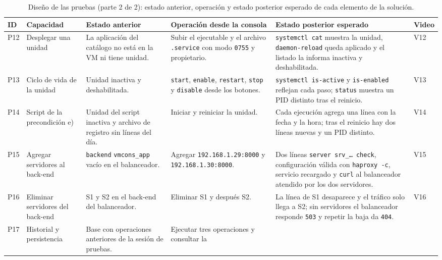 \begin{table}[!tp]
  \centering
  \caption{Diseño de las pruebas (parte 2 de 2): estado anterior,
  operación y estado posterior esperado de cada elemento de la solución.}
  \label{tab:diseno-pruebas-b}
  \scriptsize
  \begin{tabularx}{\textwidth}{@{}l >{\raggedright\arraybackslash}p{2.3cm}
      >{\raggedright\arraybackslash}X >{\raggedright\arraybackslash}X
      >{\raggedright\arraybackslash}X
      >{\raggedright\arraybackslash}p{1.0cm}@{}}
    \hline
    ID & Capacidad & Estado anterior & Operación desde la consola &
    Estado posterior esperado & Video \\
    \hline
    P12 & Desplegar una unidad & La aplicación del catálogo no está en
    la VM ni tiene unidad. & Subir el ejecutable y el archivo
    \texttt{.service} con modo \texttt{0755} y propietario. &
    \texttt{systemctl cat} muestra la unidad, \texttt{daemon-reload}
    queda aplicado y el listado la informa inactiva y deshabilitada.
    & V12 \\
    P13 & Ciclo de vida de la unidad & Unidad inactiva y deshabilitada.
    & \texttt{start}, \texttt{enable}, \texttt{restart},
    \texttt{stop} y \texttt{disable} desde los botones. &
    \texttt{systemctl is-active} y \texttt{is-enabled} reflejan cada
    paso; \texttt{status} muestra un PID distinto tras el reinicio.
    & V13 \\
    P14 & Script de la precondición e) & Unidad del script inactiva y
    archivo de registro sin líneas del día. & Iniciar y reiniciar la
    unidad. & Cada ejecución agrega una línea con la fecha y la hora;
    tras el reinicio hay dos líneas nuevas y un PID distinto. & V14 \\
    P15 & Agregar servidores al back-end & \texttt{backend}
    \texttt{vmcons\_app} vacío en el balanceador. & Agregar
    \texttt{192.168.1.29:8000} y \texttt{192.168.1.30:8000}. & Dos
    líneas \texttt{server srv\_\dots\ check}, configuración válida con
    \texttt{haproxy -c}, servicio recargado y \texttt{curl} al
    balanceador atendido por los dos servidores. & V15 \\
    P16 & Eliminar servidores del back-end & S1 y S2 en el back-end
    del balanceador. & Eliminar S1 y después S2. & La línea de S1
    desaparece y el tráfico solo llega a S2; sin servidores el
    balanceador responde \texttt{503} y repetir la baja da
    \texttt{404}. & V16 \\
    P17 & Historial y persistencia & Base con operaciones anteriores de
    la sesión de pruebas. & Ejecutar tres operaciones y consultar la

\end{tabularx}
\end{table}
